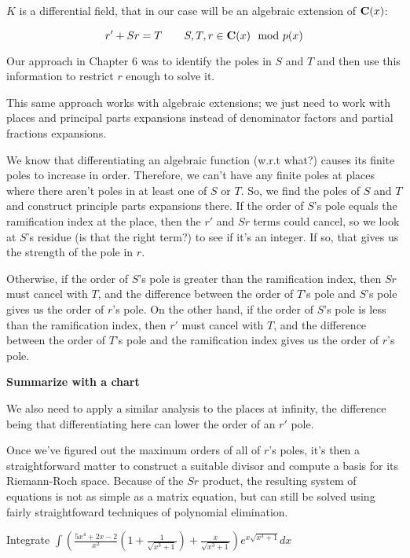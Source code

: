 $K$ is a differential field, that in our case will be an algebraic
extension of $\mathbf{C}(x)$:

\begin{equation}
\label{eq: simple algebraic Risch}
r' + S r = T \qquad S,T,r \in \mathbf{C}(x) \mod p(x)
\end{equation}

Our approach in Chapter 6 was to identify the poles in $S$ and $T$
and then use this information to restrict $r$ enough to solve it.

This same approach works with algebraic extensions; we just need to
work with places and principal parts expansions instead of denominator
factors and partial fractions expansions.

We know that differentiating an algebraic function (w.r.t what?)
causes its finite poles to increase in order.  Therefore, we can't
have any finite poles at places where there aren't poles in at least
one of $S$ or $T$.  So, we find the poles of $S$ and $T$ and construct
principle parts expansions there.  If the order of $S$'s pole equals
the ramification index at the place, then the $r'$ and $S r$ terms
could cancel, so we look at $S$'s residue (is that the right term?)
to see if it's an integer.  If so, that gives us the strength
of the pole in $r$.

Otherwise, if the order of $S$'s pole is greater than the ramification
index, then $S r$ must cancel with $T$, and the difference between the
order of $T$'s pole and $S$'s pole gives us the order of $r$'s pole.
On the other hand, if the order of $S$'s pole is less than the
ramification index, then $r'$ must cancel with $T$, and the difference
between the order of $T$'s pole and the ramification index gives us
the order of $r$'s pole.

{\bf Summarize with a chart}

We also need to apply a similar analysis to the places at infinity,
the difference being that differentiating here can lower the order of
an $r'$ pole.

Once we've figured out the maximum orders of all of $r$'s poles, it's
then a straightforward matter to construct a suitable divisor and
compute a basis for its Riemann-Roch space.  Because of the $S r$
product, the resulting system of equations is not as simple as a
matrix equation, but can still be solved using fairly straightfoward
techniques of polynomial elimination.

\example
Integrate $\int \left(\frac{5x^4+2x-2}{x^2}\left(1+\frac{1}{\sqrt{x^3+1}}\right) + \frac{x}{\sqrt{x^3+1}}\right)e^{x\sqrt{x^3+1}} dx$

